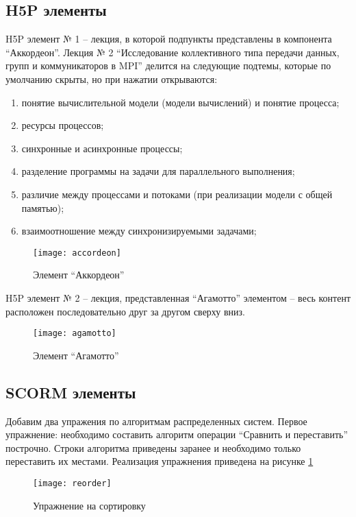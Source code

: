 \documentclass[a4paper,14pt]{extarticle}
\begin{document}
\subsection*{H5P элементы}
H5P элемент № 1 -- лекция, в которой подпункты представлены в компонента
\enquote{Аккордеон}. Лекция № 2 \enquote{Исследование коллективного типа
передачи данных, групп и коммуникаторов в MPI} делится на следующие подтемы,
которые по умолчанию скрыты, но при нажатии открываются:
\begin{enumerate}
    \item понятие вычислительной модели (модели вычислений) и понятие процесса;
    \item ресурсы процессов;
    \item синхронные и асинхронные процессы;
    \item разделение программы на задачи для параллельного выполнения;
    \item различие между процессами и потоками (при реализации модели с общей памятью);
    \item взаимоотношение между синхронизируемыми задачами;
\end{enumerate}

\begin{figure}[H]
    \centering
    \texttt{[image: accordeon]}
    \caption{Элемент \enquote{Аккордеон}}
\end{figure}

H5P элемент № 2 -- лекция, представленная \enquote{Агамотто} элементом -- весь
контент расположен последовательно друг за другом сверху вниз.

\begin{figure}[H]
    \centering
    \texttt{[image: agamotto]}
    \caption{Элемент \enquote{Агамотто}}
\end{figure}

\subsection*{SCORM элементы}
Добавим два упражения по алгоритмам распределенных систем. Первое упражнение:
необходимо составить алгоритм операции \enquote{Сравнить и переставить}
построчно. Строки алгоритма приведены заранее и необходимо только переставить их
местами. Реализация упражнения приведена на рисунке \ref{fig:reorder}

\begin{figure}[H]
    \centering
    \texttt{[image: reorder]}
    \caption{Упражнение на сортировку}
    \label{fig:reorder}
\end{figure}
\end{document}
